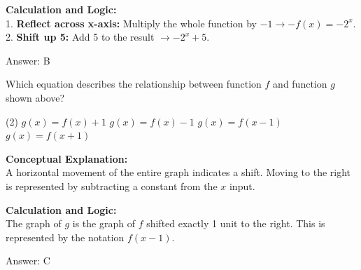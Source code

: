 \documentclass[11pt,paper=a4,answers]{exam}
\begin{document}
\begin{questions}
\begin{solution}
\textbf{Calculation and Logic:} \\
1. \textbf{Reflect across x-axis:} Multiply the whole function by $-1 \rightarrow -f(x) = -2^x$. \\
2. \textbf{Shift up 5:} Add 5 to the result $\rightarrow -2^x + 5$.

\vspace{25pt}

Answer: \colorbox{yellow!100}{B}
\end{solution}

\vspace{40pt}

\question
\begin{center}
\end{center}
Which equation describes the relationship between function $f$ and function $g$ shown above?
\begin{tasks}(2)
    \task $g(x) = f(x) + 1$
    \task $g(x) = f(x) - 1$
    \task $g(x) = f(x - 1)$
    \task $g(x) = f(x + 1)$
\end{tasks}

\begin{solution}
\textbf{Conceptual Explanation:} \\
A horizontal movement of the entire graph indicates a shift. Moving to the right is represented by subtracting a constant from the $x$ input.

\vspace{20pt}

\textbf{Calculation and Logic:} \\
The graph of $g$ is the graph of $f$ shifted exactly 1 unit to the right. This is represented by the notation $f(x-1)$.

\vspace{25pt}

Answer: \colorbox{yellow!100}{C}
\end{solution}

\vspace{40pt}


\end{questions}
\end{document}
